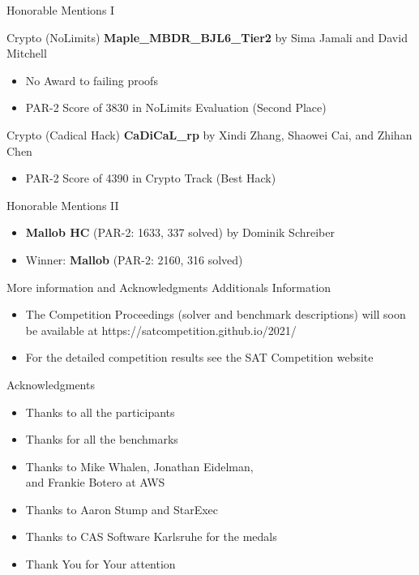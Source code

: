 \documentclass{beamer}
\begin{document}
\begin{frame}{Honorable Mentions I}

\begin{block}{Crypto (NoLimits)}
\textbf{Maple\_MBDR\_BJL6\_Tier2} by Sima Jamali and David Mitchell
\begin{itemize}
\item No Award to failing proofs
\item PAR-2 Score of 3830 in NoLimits Evaluation (Second Place)
\end{itemize}
\end{block}

\begin{block}{Crypto (Cadical Hack)}
\textbf{CaDiCaL\_rp} by Xindi Zhang, Shaowei Cai, and Zhihan Chen
\begin{itemize}
\item PAR-2 Score of 4390 in Crypto Track (Best Hack)
\end{itemize}
\end{block}

\end{frame}


\begin{frame}{Honorable Mentions II}
\begin{itemize}
\item {\bf Mallob HC} (PAR-2: 1633, 337 solved) by Dominik Schreiber
\item Winner: {\bf Mallob} (PAR-2: 2160, 316 solved)
\end{itemize}
\centering
{}
\end{frame}


\begin{frame}{More information and Acknowledgments}
Additionals Information
\begin{itemize}
	\item The Competition Proceedings (solver and benchmark descriptions)
	 will soon be available at https://satcompetition.github.io/2021/
	\item For the detailed competition results see the SAT Competition website
\end{itemize}
\medskip

Acknowledgments
\begin{itemize}
\item Thanks to all the participants
\item Thanks for all the benchmarks
\item Thanks to Mike Whalen, Jonathan Eidelman,\\and Frankie Botero at AWS
\item Thanks to Aaron Stump and StarExec
\item Thanks to CAS Software Karlsruhe for the medals
\end{itemize}
\begin{itemize}
\item Thank You for Your attention
\end{itemize}
\end{frame}


\end{document}
